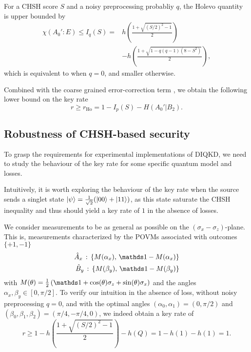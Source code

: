 For a CHSH score $S$ and a noisy preprocessing probabliy $q$, the Holevo quantity is upper bounded by
\begin{equation}
	\begin{split}
		\chi(A_0' : E) \leq I_q(S) = &h\left(\frac{1+\sqrt{(S/2)^2-1}}{2}\right) \\
									&-h\left(\frac{1+\sqrt{1-q(q-1)(8-S^2)}}{2} \right),
	\end{split}	
\end{equation}
which is equivalent to  when $q=0$, and smaller otherwise.

Combined with the coarse grained error-correction term , we obtain the following lower bound on the key rate
\begin{equation}
	r \geq r_\mathrm{Ho} = 1 - I_p(S) - H(A_0'|B_2).
	\label{eq:Ho}
\end{equation}


\subsection{Robustness of CHSH-based security}
\label{sec:robust_DIQKD}

To grasp the requirements for experimental implementations of DIQKD, we need to study the behaviour of the key rate for some specific quantum model and losses.

\medbreak

Intuitively, it is worth exploring the behaviour of the key rate when the source sends a singlet state $\ket{\psi}=\frac{1}{\sqrt{2}}(\ket{00}+\ket{11})$, as this state saturate the CHSH inequality and thus should yield a key rate of $1$ in the absence of losses.

We consider measurements to be as general as possible on the $(\sigma_x-\sigma_z)$-plane. This is, measurements characterized by the POVMs associated with outcomes $\{+1,-1\}$
\begin{equation}
	\begin{split}
		\hat{A}_x\,:\, \{M(\alpha_x),\, \id-M(\alpha_x)\} \\
		\hat{B}_y\,:\, \{M(\beta_y),\, \id-M(\beta_y)\}
	\end{split}	
\end{equation}
with $M(\theta) = \frac{1}{2}\left(\id + \cos(\theta)\sigma_z + \sin(\theta)\sigma_x \right)$ and the angles $\alpha_x,\beta_y\in[0,\pi/2]$.
To verify our intuition in the absence of loss, without noisy preprocessing $q=0$, and with the optimal angles $(\alpha_0,\alpha_1)=(0,\pi/2)$ and $(\beta_0,\beta_1,\beta_2)=(\pi/4,-\pi/4,0)$, we indeed obtain a key rate of
\begin{equation}
	r \geq 1-h\left(\frac{1+\sqrt{(S/2)^2-1}}{2}\right)-h(Q) = 1 - h(1) - h(1) = 1.
\end{equation}

